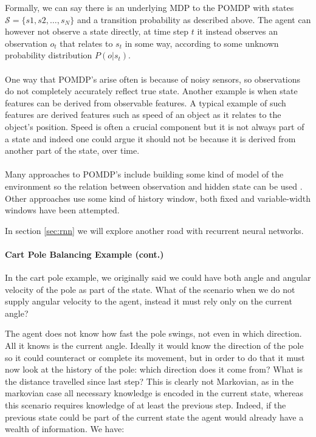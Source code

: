 Formally, we can say there is an underlying MDP to the POMDP
with states $\mathcal{S} = \{s1, s2,\dots,s_N\}$
and a transition probability as described above.
The agent can however not observe a state directly,
at time step $t$ it instead observes an observation $o_t$
that relates to $s_t$ in some way,
according to some unknown probability distribution $P(o|s_t)$.

\paragraph{}
One way that POMDP's arise often is because of noisy sensors,
so observations do not completely accurately reflect true state.
Another example is when state features can be derived
from observable features.
A typical example of such features are derived features
such as speed of an object as it relates to the object's position.
Speed is often a crucial component but it is not always
part of a state and indeed one could argue it should not be
because it is derived from another part of the state, over time.

\paragraph{}
Many approaches to POMDP's
include building some kind of model of the environment
so the relation between observation and hidden state can be used
\parencite{Cassandra1994}.
Other approaches use some kind of history window,
both fixed
\parencite{mccallum1995instance}
and variable-width windows
\parencite{ring1994continual}
have been attempted.

In section \ref{sec:rnn}
we will explore another road
with recurrent neural networks.

\paragraph{Cart Pole Balancing Example (cont.)}
In the cart pole example, we originally said we could have both angle
and angular velocity of the pole as part of the state.
What of the scenario when we do not supply angular velocity to the agent,
instead it must rely only on the current angle?

The agent does not know how fast the pole swings,
not even in which direction.
All it knows is the current angle.
Ideally it would know the direction of the pole
so it could counteract or complete its movement,
but in order to do that it must now look at the history
of the pole: which direction does it come from?
What is the distance travelled since last step?
This is clearly not Markovian,
as in the markovian case all necessary knowledge
is encoded in the current state,
whereas this scenario requires knowledge of at least the previous step.
Indeed, if the previous state could be part of the current state
the agent would already have a wealth of information.
We have:

